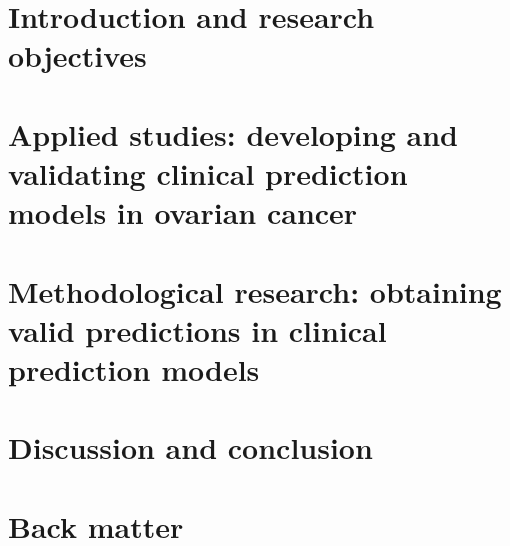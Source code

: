 \documentclass[11pt,twoside,a5paper]{thesislayout}
\begin{document}

\part{Introduction and research objectives}
\label{part:intro}




\part{Applied studies: developing and validating clinical prediction models in ovarian cancer}
\label{part:applied}





\part{Methodological research: obtaining valid predictions in clinical prediction models}
\label{part:methods}






\part{Discussion and conclusion}
\label{part:discussion}


 


\renewcommand*{\bibfont}{\footnotesize}
\printbibliography[heading=bibintoc]

\part{Back matter}
\label{part:backmatter}
\markboth{}{}





\makebackcover

% 
\end{document}
